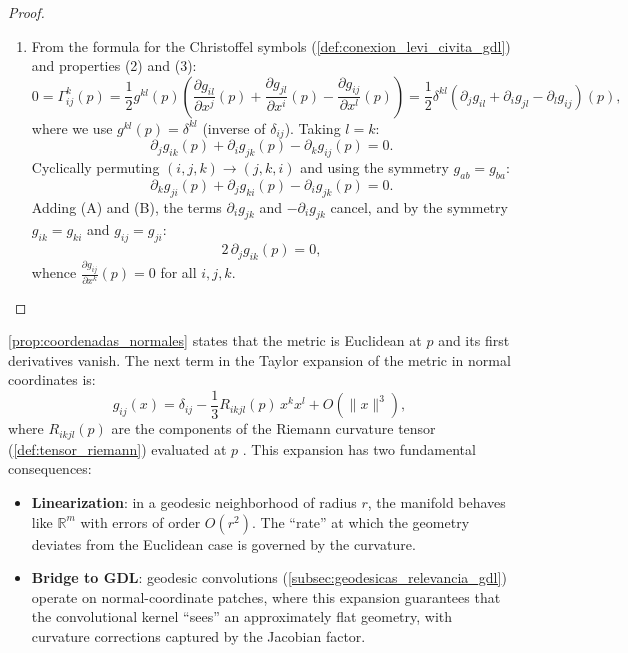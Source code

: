 \begin{proof}
\begin{enumerate}
	\item From the formula for the Christoffel symbols (\autoref{def:conexion_levi_civita_gdl}) and properties (2) and (3):
	\[
	0 = \Gamma^k_{ij}(p) = \frac{1}{2}g^{kl}(p)\left(\frac{\partial g_{il}}{\partial x^j}(p) + \frac{\partial g_{jl}}{\partial x^i}(p) - \frac{\partial g_{ij}}{\partial x^l}(p)\right) = \frac{1}{2}\delta^{kl}\left(\partial_j g_{il} + \partial_i g_{jl} - \partial_l g_{ij}\right)\!(p),
	\]
	where we use $g^{kl}(p) = \delta^{kl}$ (inverse of $\delta_{ij}$). Taking $l = k$:
	\begin{equation}\tag{A}
	\partial_j g_{ik}(p) + \partial_i g_{jk}(p) - \partial_k g_{ij}(p) = 0.
	\end{equation}
	Cyclically permuting $(i,j,k) \to (j,k,i)$ and using the symmetry $g_{ab} = g_{ba}$:
	\begin{equation}\tag{B}
	\partial_k g_{ji}(p) + \partial_j g_{ki}(p) - \partial_i g_{jk}(p) = 0.
	\end{equation}
	Adding (A) and (B), the terms $\partial_i g_{jk}$ and $-\partial_i g_{jk}$ cancel, and by the symmetry $g_{ik} = g_{ki}$ and $g_{ij} = g_{ji}$:
	\[
	2\,\partial_j g_{ik}(p) = 0,
	\]
	whence $\frac{\partial g_{ij}}{\partial x^k}(p) = 0$ for all $i, j, k$. \qedhere
\end{enumerate}
\end{proof}

\begin{remark}\label{rem:coordenadas_normales_linealizacion}
\autoref{prop:coordenadas_normales} states that the metric is Euclidean at $p$ and its first derivatives vanish. The next term in the Taylor expansion of the metric in normal coordinates is:
\begin{equation}\label{eq:expansion_metrica_normales}
g_{ij}(x) = \delta_{ij} - \frac{1}{3} R_{ikjl}(p) \, x^k x^l + O(\|x\|^3),
\end{equation}
where $R_{ikjl}(p)$ are the components of the Riemann curvature tensor (\autoref{def:tensor_riemann}) evaluated at $p$ \citep[Lemma~5.10]{lee2018introduction}. This expansion has two fundamental consequences:
\begin{itemize}
	\item \textbf{Linearization}: in a geodesic neighborhood of radius $r$, the manifold behaves like $\mathbb{R}^m$ with errors of order $O(r^2)$. The ``rate'' at which the geometry deviates from the Euclidean case is governed by the curvature.
	\item \textbf{Bridge to GDL}: geodesic convolutions (\autoref{subsec:geodesicas_relevancia_gdl}) operate on normal-coordinate patches, where this expansion guarantees that the convolutional kernel ``sees'' an approximately flat geometry, with curvature corrections captured by the Jacobian factor.
\end{itemize}
\end{remark}

